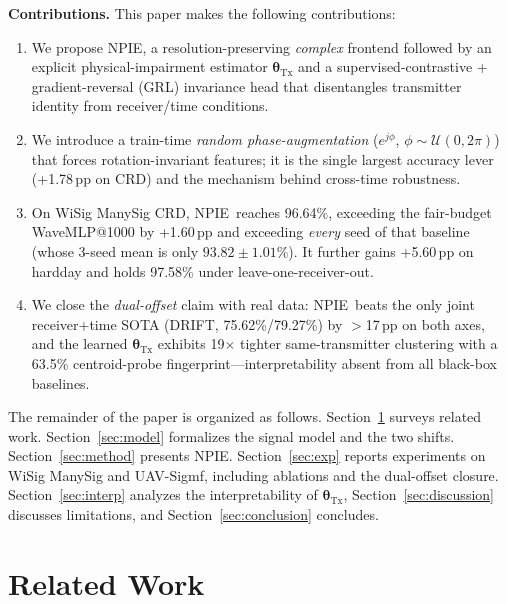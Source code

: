 \documentclass[journal]{IEEEtran}
\newcommand{\npie}{\textsc{NPIE}}
\newcommand{\tx}{\boldsymbol{\theta}_{\mathrm{Tx}}}
\begin{document}
\textbf{Contributions.} This paper makes the following contributions:
\begin{enumerate}
\item We propose \npie, a resolution-preserving \emph{complex} frontend followed by an explicit physical-impairment estimator $\tx$ and a supervised-contrastive + gradient-reversal (GRL) invariance head that disentangles transmitter identity from receiver/time conditions.
\item We introduce a train-time \emph{random phase-augmentation} ($e^{j\phi}$, $\phi\sim\mathcal{U}(0,2\pi)$) that forces rotation-invariant features; it is the single largest accuracy lever (+1.78\,pp on CRD) and the mechanism behind cross-time robustness.
\item On WiSig ManySig CRD, \npie\ reaches 96.64\%, exceeding the fair-budget WaveMLP@1000 by +1.60\,pp and exceeding \emph{every} seed of that baseline (whose 3-seed mean is only $93.82\pm1.01\%$). It further gains +5.60\,pp on hardday and holds 97.58\% under leave-one-receiver-out.
\item We close the \emph{dual-offset} claim with real data: \npie\ beats the only joint receiver+time SOTA (DRIFT, 75.62\%/79.27\%) by $>$17\,pp on both axes, and the learned $\tx$ exhibits 19$\times$ tighter same-transmitter clustering with a 63.5\% centroid-probe fingerprint---interpretability absent from all black-box baselines.
\end{enumerate}

The remainder of the paper is organized as follows. Section~\ref{sec:related} surveys related work. Section~\ref{sec:model} formalizes the signal model and the two shifts. Section~\ref{sec:method} presents \npie. Section~\ref{sec:exp} reports experiments on WiSig ManySig and UAV-Sigmf, including ablations and the dual-offset closure. Section~\ref{sec:interp} analyzes the interpretability of $\tx$, Section~\ref{sec:discussion} discusses limitations, and Section~\ref{sec:conclusion} concludes.

\section{Related Work}
\label{sec:related}
\end{document}
